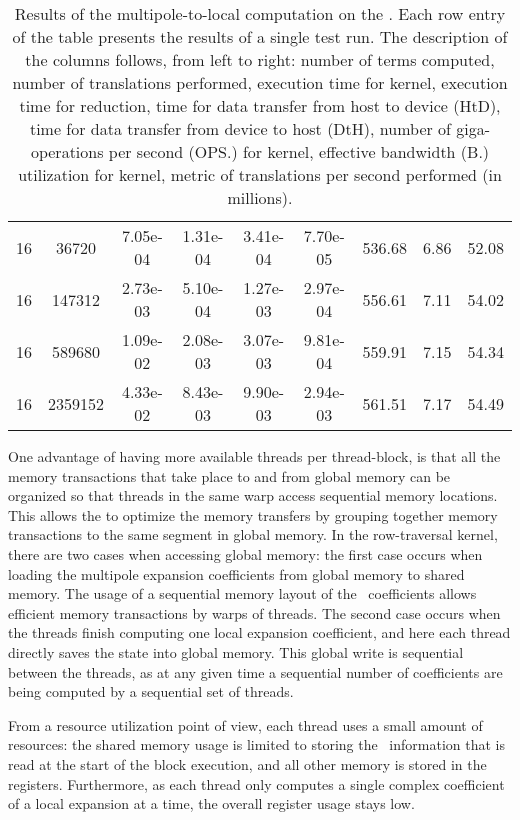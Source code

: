 \begin{table*}
\begin{tabular}{|c|c|c|c|c|c|c|c|c|}
\rowcolor[gray]{0.9}16  &  36720  &  7.05e-04 &  1.31e-04 &  3.41e-04 &  7.70e-05 &  536.68 &  6.86 &  52.08  \\
\rowcolor[gray]{1.0}16  &  147312  &  2.73e-03 &  5.10e-04 &  1.27e-03 &  2.97e-04 &  556.61 &  7.11 &  54.02  \\
\rowcolor[gray]{0.9}16  &  589680  &  1.09e-02 &  2.08e-03 &  3.07e-03 &  9.81e-04 &  559.91 &  7.15 &  54.34  \\
\rowcolor[gray]{1.0}16  &  2359152  &  4.33e-02 &  8.43e-03 &  9.90e-03 &  2.94e-03 &  561.51 &  7.17 &  54.49  \\
\hline
\end{tabular}
\caption{Results of the multipole-to-local computation on the {\NV} {\fermi} {\gpu}. Each row entry of the table presents
the results of a single test run. The description of the columns follows, from left to right:
number of terms computed, number of translations performed, {\gpu} execution time for {\ML} kernel,
{\gpu} execution time for reduction, time for data transfer from host to device (HtD), time for data transfer
from device to host (DtH), number of giga-operations per second (OPS.) for {\ML} kernel, effective bandwidth (B.)
utilization for {\ML} kernel, metric of {\ML} translations per second performed (in millions).}
\label{tab:m2lfermi}
\end{table*}
 
One advantage of having more available threads per thread-block, is that all the memory transactions that take place to and from global memory can be organized so that threads in the same warp access sequential memory locations. This allows the {\gpu} to optimize the memory transfers by grouping together memory transactions to the same segment in global memory. In the row-traversal kernel, there are two cases when accessing global memory: the first case occurs when loading the multipole expansion coefficients from global memory to shared memory. The usage of a sequential memory layout of the \ME\ coefficients allows efficient memory transactions by warps of threads.  The second case occurs when the threads finish computing one local expansion coefficient, and here each thread directly saves the state into global memory. This global write is sequential between the threads, as at any given time a sequential number of coefficients are being computed by a sequential set of threads.

From a resource utilization point of view, each thread uses a small amount of resources: the shared memory usage is limited to storing the \ME\ information that is read at the start of the block execution, and all other memory is stored in the registers. Furthermore, as each thread only computes a single complex coefficient of a local expansion at a time, the overall register usage stays low.

